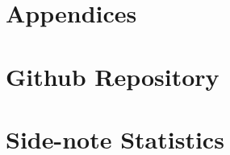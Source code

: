 \chapter*{\LARGE Appendices}

\appendix

\chapter{Github Repository}


\chapter{Side-note Statistics}

